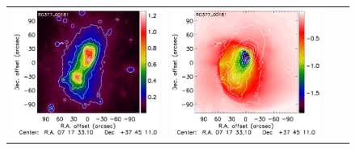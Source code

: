 \documentclass[traditabstract]{aa}
\begin{document}
\begin{figure}[h]
{\begin{tabular}{llll}
\includegraphics[trim=0cm 2.2cm 0cm 0cm, clip=true, scale=1]{Figure/Map_RG377_00181_DMmap_zproj_zobs0p5_raw.pdf} & 
\includegraphics[trim=2.3cm 2.2cm 0cm 0cm, clip=true, scale=1]{Figure/Map_RG377_00181_Ymap_zobs0p5_raw.pdf} & 

\end{tabular}}
\end{figure}
\end{document}
